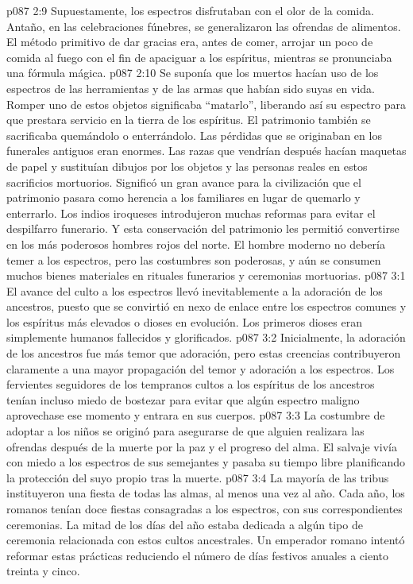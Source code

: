 \vs p087 2:9 Supuestamente, los espectros disfrutaban con el olor de la comida. Antaño, en las celebraciones fúnebres, se generalizaron las ofrendas de alimentos. El método primitivo de dar gracias era, antes de comer, arrojar un poco de comida al fuego con el fin de apaciguar a los espíritus, mientras se pronunciaba una fórmula mágica.
\vs p087 2:10 Se suponía que los muertos hacían uso de los espectros de las herramientas y de las armas que habían sido suyas en vida. Romper uno de estos objetos significaba “matarlo”, liberando así su espectro para que prestara servicio en la tierra de los espíritus. El patrimonio también se sacrificaba quemándolo o enterrándolo. Las pérdidas que se originaban en los funerales antiguos eran enormes. Las razas que vendrían después hacían maquetas de papel y sustituían dibujos por los objetos y las personas reales en estos sacrificios mortuorios. Significó un gran avance para la civilización que el patrimonio pasara como herencia a los familiares en lugar de quemarlo y enterrarlo. Los indios iroqueses introdujeron muchas reformas para evitar el despilfarro funerario. Y esta conservación del patrimonio les permitió convertirse en los más poderosos hombres rojos del norte. El hombre moderno no debería temer a los espectros, pero las costumbres son poderosas, y aún se consumen muchos bienes materiales en rituales funerarios y ceremonias mortuorias.
\vs p087 3:1 El avance del culto a los espectros llevó inevitablemente a la adoración de los ancestros, puesto que se convirtió en nexo de enlace entre los espectros comunes y los espíritus más elevados o dioses en evolución. Los primeros dioses eran simplemente humanos fallecidos y glorificados.
\vs p087 3:2 Inicialmente, la adoración de los ancestros fue más temor que adoración, pero estas creencias contribuyeron claramente a una mayor propagación del temor y adoración a los espectros. Los fervientes seguidores de los tempranos cultos a los espíritus de los ancestros tenían incluso miedo de bostezar para evitar que algún espectro maligno aprovechase ese momento y entrara en sus cuerpos.
\vs p087 3:3 La costumbre de adoptar a los niños se originó para asegurarse de que alguien realizara las ofrendas después de la muerte por la paz y el progreso del alma. El salvaje vivía con miedo a los espectros de sus semejantes y pasaba su tiempo libre planificando la protección del suyo propio tras la muerte.
\vs p087 3:4 La mayoría de las tribus instituyeron una fiesta de todas las almas, al menos una vez al año. Cada año, los romanos tenían doce fiestas consagradas a los espectros, con sus correspondientes ceremonias. La mitad de los días del año estaba dedicada a algún tipo de ceremonia relacionada con estos cultos ancestrales. Un emperador romano intentó reformar estas prácticas reduciendo el número de días festivos anuales a ciento treinta y cinco.

